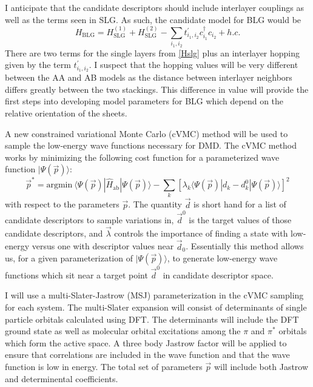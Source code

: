 \documentclass[12pt]{article}
\begin{document}
I anticipate that the candidate descriptors should include interlayer couplings as well as the terms seen in SLG.
As such, the candidate model for BLG would be
\begin{equation}
H_\text{BLG} = H_\text{SLG}^{(1)} + H_\text{SLG}^{(2)} - \sum_{i_1, i_2} t_{i_1, i_2}^\prime c_{i_1}^\dagger c_{i_2} + h.c.
\label{Hblg}
\end{equation}
There are two terms for the single layers from \eqref{Hslg} plus an interlayer hopping given by the term $t_{i_1, i_2}^\prime.$
I suspect that the hopping values will be very different between the AA and AB models as the distance between interlayer neighbors differs greatly between the two stackings.
This difference in value will provide the first steps into developing model parameters for BLG which depend on the relative orientation of the sheets.

A new constrained variational Monte Carlo (cVMC) method will be used to sample the low-energy wave functions necessary for DMD.
The cVMC method works by minimizing the following cost function for a parameterized wave function $|\Psi(\vec{p})\rangle$:
\begin{equation}
\vec{p}^* = \text{argmin} \ \langle \Psi(\vec{p}) | \hat{H}_\text{ab} | \Psi(\vec{p}) \rangle - \sum_k [\lambda_k \langle \Psi(\vec{p}) | d_k - d_{k}^0 | \Psi(\vec{p}) \rangle]^2
\end{equation}
with respect to the parameters $\vec{p}$.
The quantity $\vec{d}$ is short hand for a list of candidate descriptors to sample variations in, $\vec{d}^0$ is the target values of those candidate descriptors, and $\vec{\lambda}$ controls the importance of finding a state with low-energy versus one with descriptor values near $\vec{d}_0$.
Essentially this method allows us, for a given parameterization of $|\Psi(\vec{p})\rangle$, to generate low-energy wave functions which sit near a target point $\vec{d}^0$ in candidate descriptor space.

I will use a multi-Slater-Jastrow (MSJ) parameterization in the cVMC sampling for each system.
The multi-Slater expansion will consist of determinants of single particle orbitals calculated using DFT.
The determinants will include the DFT ground state as well as molecular orbital excitations among the $\pi$ and $\pi^*$ orbitals which form the active space.
A three body Jastrow factor will be applied to ensure that correlations are included in the wave function and that the wave function is low in energy.
The total set of parameters $\vec{p}$ will include both Jastrow and determinental coefficients.
\end{document}
